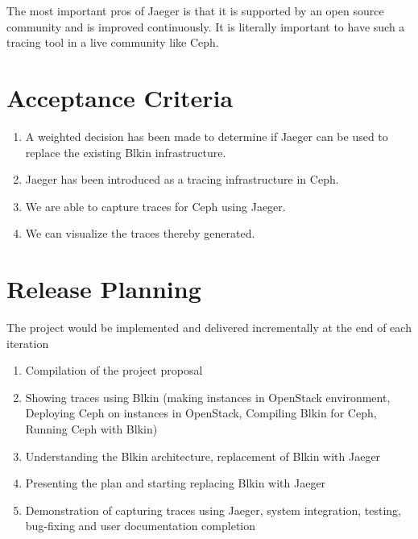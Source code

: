 \documentclass[a4paper, 11pt]{article}
\begin{document}
The most important pros of Jaeger is that it is supported by an open source community and is improved continuously. It is literally important to have such a tracing tool in a live community like Ceph.


\section{Acceptance Criteria}
\begin{enumerate}
	\item A weighted decision has been made to determine if Jaeger can be used to replace the existing Blkin infrastructure.
	\item Jaeger has been introduced as a tracing infrastructure in Ceph.
	\item We are able to capture traces for Ceph using Jaeger.
	\item We can visualize the traces thereby generated.
\end{enumerate}



\section{Release Planning}
The project would be implemented and delivered incrementally at the end of each iteration
\begin{enumerate}
\item Compilation of the project proposal
\item Showing traces using Blkin (making instances in OpenStack environment, Deploying Ceph on instances  in OpenStack, Compiling Blkin for Ceph, Running Ceph with Blkin)
\item Understanding the Blkin architecture, replacement of Blkin with Jaeger
\item Presenting the plan and starting replacing Blkin with Jaeger
\item Demonstration of capturing traces using Jaeger, system integration, testing, bug-fixing and user documentation completion
\end{enumerate}


\nocite{*}


\end{document}
